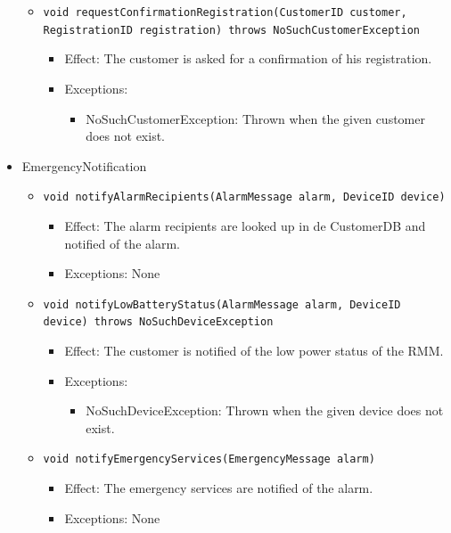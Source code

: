 \documentclass[a4paper,10pt]{article}
\begin{document}
\begin{itemize}
\begin{itemize}
        \item \texttt{void requestConfirmationRegistration(CustomerID customer, RegistrationID registration) throws NoSuchCustomerException}
        \begin{itemize}
            \item Effect: The customer is asked for a confirmation of his registration.
            \item Exceptions: 
            \begin{itemize}
                \item NoSuchCustomerException: Thrown when the given customer does not exist.
            \end{itemize}
        \end{itemize}
    \end{itemize}
    
	\item EmergencyNotification
    \begin{itemize}
    	\item \texttt{void notifyAlarmRecipients(AlarmMessage alarm, DeviceID device)}
        \begin{itemize}
            \item Effect: The alarm recipients are looked up in de CustomerDB and notified of the alarm.
            \item Exceptions: None
		\end{itemize}
        
        \item \texttt{void notifyLowBatteryStatus(AlarmMessage alarm, DeviceID device) throws NoSuchDeviceException}
        \begin{itemize}
        	\item Effect: The customer is notified of the low power status of the RMM.
            \item Exceptions:
            \begin{itemize}
                \item NoSuchDeviceException: Thrown when the given device does not exist.
            \end{itemize}
        \end{itemize}
        
        \item \texttt{void notifyEmergencyServices(EmergencyMessage alarm)}
        \begin{itemize}
            \item Effect: The emergency services are notified of the alarm.
            \item Exceptions: None
		\end{itemize}
    \end{itemize}
    

\end{itemize}
\end{document}
